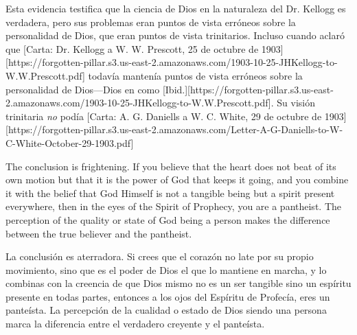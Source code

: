 Esta evidencia testifica que la ciencia de Dios en la naturaleza del Dr. Kellogg es verdadera, pero sus problemas eran puntos de vista erróneos sobre la personalidad de Dios, que eran puntos de vista trinitarios. Incluso cuando aclaró que [Carta: Dr. Kellogg a W. W. Prescott, 25 de octubre de 1903][https://forgotten-pillar.s3.us-east-2.amazonaws.com/1903-10-25-JHKellogg-to-W.W.Prescott.pdf] todavía mantenía puntos de vista erróneos sobre la personalidad de Dios—Dios en  como [Ibid.][https://forgotten-pillar.s3.us-east-2.amazonaws.com/1903-10-25-JHKellogg-to-W.W.Prescott.pdf]. Su visión trinitaria \textit{no} podía [Carta: A. G. Daniells a W. C. White, 29 de octubre de 1903][https://forgotten-pillar.s3.us-east-2.amazonaws.com/Letter-A-G-Daniells-to-W-C-White-October-29-1903.pdf]


The conclusion is frightening. If you believe that the heart does not beat of its own motion but that it is the power of God that keeps it going, and you combine it with the belief that God Himself is not a tangible being but a spirit present everywhere, then in the eyes of the Spirit of Prophecy, you are a pantheist. The perception of the quality or state of God being a person makes the difference between the true believer and the pantheist.


La conclusión es aterradora. Si crees que el corazón no late por su propio movimiento, sino que es el poder de Dios el que lo mantiene en marcha, y lo combinas con la creencia de que Dios mismo no es un ser tangible sino un espíritu presente en todas partes, entonces a los ojos del Espíritu de Profecía, eres un panteísta. La percepción de la cualidad o estado de Dios siendo una persona marca la diferencia entre el verdadero creyente y el panteísta.





% 
